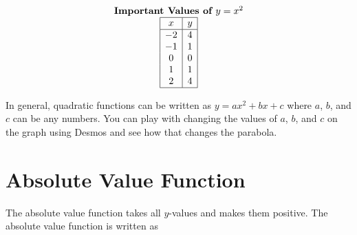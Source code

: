 \documentclass[nooutcomes]{ximera}
\begin{document}
\begin{image}
\end{image}

\begin{image}
\end{image}

\[
\begin{array}{c }
\text{\textbf{Important Values of $y=x^2$}} \\
\begin{array}{|c|c|}
 \hline
 x & y\\
 \hline
 -2&4\\
 -1&1\\
 0&0\\
 1&1\\
 2&4\\
 \hline
\end{array}
\end{array}
\]

In general, quadratic functions can be written as $y=ax^2+bx+c$ where $a$, $b$, and $c$ can be any numbers.  You can play with changing the values of $a$, $b$, and $c$ on the graph using Desmos and see how that changes the parabola.  

\begin{center}  
\end{center}


\newpage


\section{Absolute Value Function}
The absolute value function takes all $y$-values and makes them positive.  The absolute value function is written as 

\begin{image}
\end{image}
\end{document}
